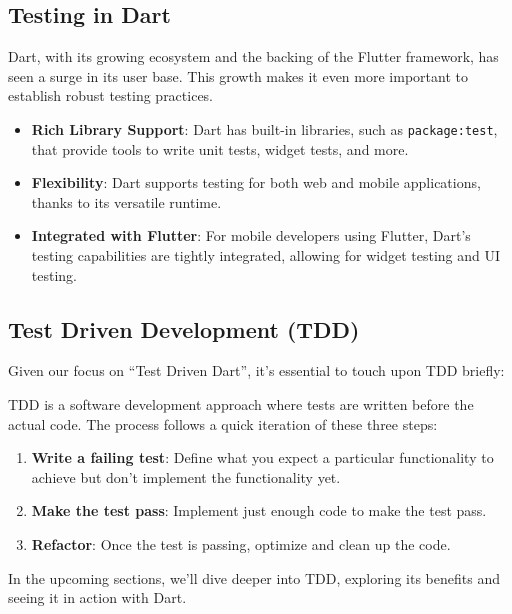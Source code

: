 \documentclass[
]{article}
\providecommand{\tightlist}{%
  \setlength{\itemsep}{0pt}\setlength{\parskip}{0pt}}
\begin{document}
\subsection{Testing in Dart}\label{testing-in-dart}

Dart, with its growing ecosystem and the backing of the Flutter
framework, has seen a surge in its user base. This growth makes it even
more important to establish robust testing practices.

\begin{itemize}
\tightlist
\item
  \textbf{Rich Library Support}: Dart has built-in libraries, such as
  \texttt{package:test}, that provide tools to write unit tests, widget
  tests, and more.
\item
  \textbf{Flexibility}: Dart supports testing for both web and mobile
  applications, thanks to its versatile runtime.
\item
  \textbf{Integrated with Flutter}: For mobile developers using Flutter,
  Dart's testing capabilities are tightly integrated, allowing for
  widget testing and UI testing.
\end{itemize}

\subsection{Test Driven Development
(TDD)}\label{test-driven-development-tdd}

Given our focus on ``Test Driven Dart'', it's essential to touch upon
TDD briefly:

TDD is a software development approach where tests are written before
the actual code. The process follows a quick iteration of these three
steps:

\begin{enumerate}
\def\labelenumi{\arabic{enumi}.}
\tightlist
\item
  \textbf{Write a failing test}: Define what you expect a particular
  functionality to achieve but don't implement the functionality yet.
\item
  \textbf{Make the test pass}: Implement just enough code to make the
  test pass.
\item
  \textbf{Refactor}: Once the test is passing, optimize and clean up the
  code.
\end{enumerate}

In the upcoming sections, we'll dive deeper into TDD, exploring its
benefits and seeing it in action with Dart.
\end{document}
